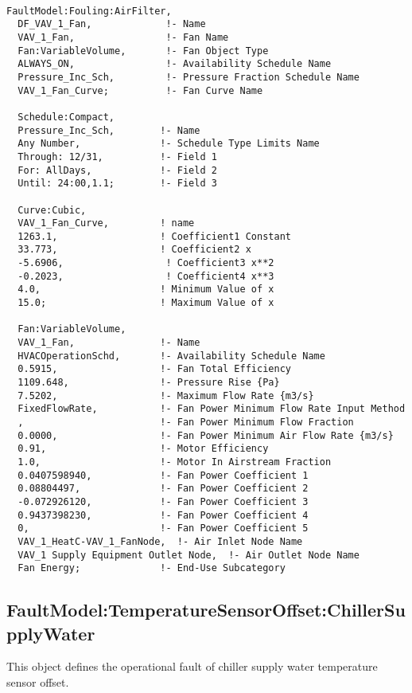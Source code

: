 \begin{lstlisting}

FaultModel:Fouling:AirFilter,
  DF_VAV_1_Fan,             !- Name
  VAV_1_Fan,                !- Fan Name
  Fan:VariableVolume,       !- Fan Object Type
  ALWAYS_ON,                !- Availability Schedule Name
  Pressure_Inc_Sch,         !- Pressure Fraction Schedule Name
  VAV_1_Fan_Curve;          !- Fan Curve Name

  Schedule:Compact,
  Pressure_Inc_Sch,        !- Name
  Any Number,              !- Schedule Type Limits Name
  Through: 12/31,          !- Field 1
  For: AllDays,            !- Field 2
  Until: 24:00,1.1;        !- Field 3

  Curve:Cubic,        
  VAV_1_Fan_Curve,         ! name     
  1263.1,                  ! Coefficient1 Constant        
  33.773,                  ! Coefficient2 x       
  -5.6906,                  ! Coefficient3 x**2        
  -0.2023,                  ! Coefficient4 x**3        
  4.0,                     ! Minimum Value of x       
  15.0;                    ! Maximum Value of x       

  Fan:VariableVolume,
  VAV_1_Fan,               !- Name
  HVACOperationSchd,       !- Availability Schedule Name
  0.5915,                  !- Fan Total Efficiency
  1109.648,                !- Pressure Rise {Pa}
  7.5202,                  !- Maximum Flow Rate {m3/s}
  FixedFlowRate,           !- Fan Power Minimum Flow Rate Input Method
  ,                        !- Fan Power Minimum Flow Fraction
  0.0000,                  !- Fan Power Minimum Air Flow Rate {m3/s}
  0.91,                    !- Motor Efficiency
  1.0,                     !- Motor In Airstream Fraction
  0.0407598940,            !- Fan Power Coefficient 1
  0.08804497,              !- Fan Power Coefficient 2
  -0.072926120,            !- Fan Power Coefficient 3
  0.9437398230,            !- Fan Power Coefficient 4
  0,                       !- Fan Power Coefficient 5
  VAV_1_HeatC-VAV_1_FanNode,  !- Air Inlet Node Name
  VAV_1 Supply Equipment Outlet Node,  !- Air Outlet Node Name
  Fan Energy;              !- End-Use Subcategory
\end{lstlisting}

\subsection{FaultModel:TemperatureSensorOffset:ChillerSupplyWater}\label{faultmodeltemperaturesensoroffsetchillersupplywater}

This object defines the operational fault of chiller supply water temperature sensor offset.


